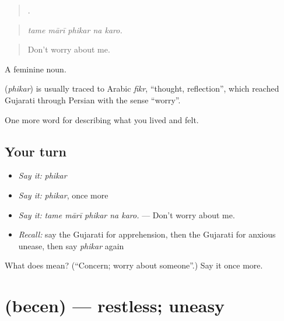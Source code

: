 \begin{quote}
    .
\end{quote}

\begin{quote}
\emph{tame mārī phikar na karo.}
\end{quote}

\begin{quote}
Don't worry about me.
\end{quote}

A feminine noun.

\begin{cousinweb}
\textbf{} (\emph{phikar}) is usually traced to Arabic \emph{fikr}, \textquotedblleft{}thought, reflection\textquotedblright{}, which reached Gujarati through Persian with the sense \textquotedblleft{}worry\textquotedblright{}.
\end{cousinweb}

\begin{grammarlens}[title={What you've built}]
One more word for describing what you lived and felt.
\end{grammarlens}

\subsection*{Your turn}
\begin{itemize}
\raggedright
  \item \emph{Say it:} \emph{phikar}
  \item \emph{Say it:} \emph{phikar}, once more
  \item \emph{Say it:} \emph{tame mārī phikar na karo.} — Don't worry about me.
  \item \emph{Recall:} say the Gujarati for apprehension, then the Gujarati for anxious unease, then say \emph{phikar} again
\end{itemize}

\begin{tcolorbox}[breakable,colback=teal!4,colframe=teal!35!black,title={Before you move on}]
What does  mean? (\textquotedblleft{}Concern; worry about someone\textquotedblright{}.) Say it once more.
\end{tcolorbox}
\section[\texorpdfstring{\gu{બેચેન} (becen)}{બેચેન (becen)}]{ (becen) — restless; uneasy}

